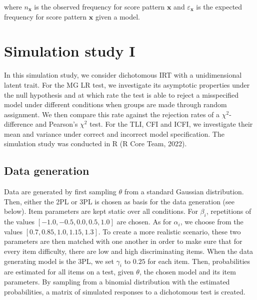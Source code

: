 \documentclass[Royal,sageapa,times,doublespace]{sagej}
\begin{document}
where $n_{\boldsymbol{x}}$ is the observed frequency for score pattern $\boldsymbol{x}$ and $\varepsilon_{\boldsymbol{x}}$ is the expected frequency for score pattern $\boldsymbol{x}$ given a model. 

\section{Simulation study I}

In this simulation study, we consider dichotomous IRT with a unidimensional latent trait. For the MG LR test, we investigate its asymptotic properties under the null hypothesis and at which rate the test is able to reject a misspecified model under different conditions when groups are made through random assignment. We then compare this rate against the rejection rates of a $\chi^2$-difference and Pearson's $\chi^2$ test. For the TLI, CFI and ICFI, we investigate their mean and variance under correct and incorrect model specification. The simulation study was conducted in R (R Core Team, 2022).
\subsection{Data generation}
Data are generated by first sampling $\theta$ from a standard Gaussian distribution. Then, either the 2PL or 3PL is chosen as basis for the data generation (see below). Item parameters are kept static over all conditions. For $\beta_i$, repetitions of the values $[-1.0, -0.5, 0.0, 0.5, 1.0]$ are chosen. As for $\alpha_i$, we choose from the values $[0.7, 0.85, 1.0, 1.15, 1.3]$. To create a more realistic scenario, these two parameters are then matched with one another in order to make sure that for every item difficulty, there are low and high discriminating items. When the data generating model is the 3PL, we set $\gamma_i$ to $0.25$ for each item. Then, probabilities are estimated for all items on a test, given $\theta$, the chosen model and its item parameters. By sampling from a binomial distribution with the estimated probabilities, a matrix of simulated responses to a dichotomous test is created.
\end{document}
